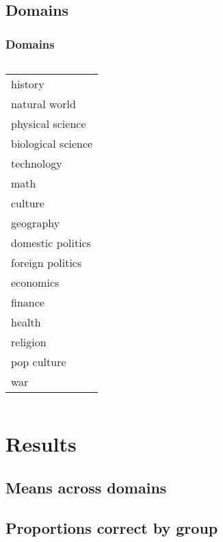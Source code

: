 \documentclass[pdf]{beamer}
\begin{document}
\subsection{Domains}
\begin{frame}
\frametitle{Domains}
  \begin{columns}
      \begin{tabular} {l}  %
        \hline   %
        history			                   \\
        natural world                  \\
        physical science               \\
        biological science             \\
        technology                     \\
        math                           \\
        culture                        \\
        geography                      \\
        domestic politics              \\
        foreign politics               \\
        economics                      \\
        finance                        \\
        health                         \\
        religion                       \\
        pop culture                    \\
        war                            \\
        \hline  %
        \end{tabular}
  \end{columns}
\end{frame}





\section{Results}
\subsection{Means across domains}
\subsection{Proportions correct by group}
\end{document}
